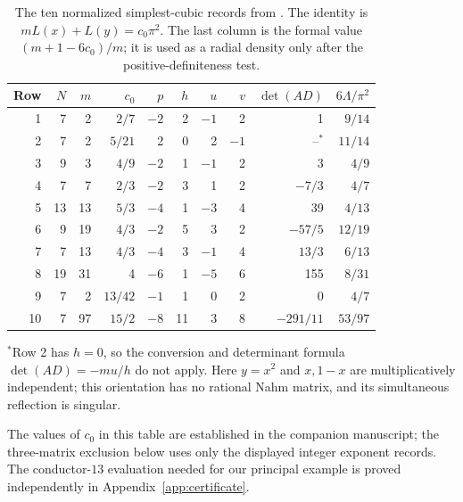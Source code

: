 \documentclass[11pt,reqno]{amsart}
\theoremstyle{remark}
\numberwithin{equation}{section}
\begin{document}
\begin{table}[htbp]
\caption{The ten normalized simplest-cubic records from
\cite{CubicClassification}. The identity is $mL(x)+L(y)=c_0\pi^2$.
The last column is the formal value $(m+1-6c_0)/m$; it is used as a
radial density only after the positive-definiteness test.}\label{tab:arithmetic-sieve}
\centering\small
\renewcommand{\arraystretch}{1.12}
\begin{tabular}{@{}rrrrrrrrrr@{}}\toprule
Row&$N$&$m$&$c_0$&$p$&$h$&$u$&$v$&$\det(AD)$&$6\Lambda/\pi^2$\\\midrule
1&7&2&$2/7$&$-2$&2&$-1$&2&1&$9/14$\\
2&7&2&$5/21$&2&0&2&$-1$&$\text{--}^{\ast}$&$11/14$\\
3&9&3&$4/9$&$-2$&1&$-1$&2&3&$4/9$\\
4&7&7&$2/3$&$-2$&3&1&2&$-7/3$&$4/7$\\
5&13&13&$5/3$&$-4$&1&$-3$&4&39&$4/13$\\
6&9&19&$4/3$&$-2$&5&3&2&$-57/5$&$12/19$\\
7&7&13&$4/3$&$-4$&3&$-1$&4&$13/3$&$6/13$\\
8&19&31&4&$-6$&1&$-5$&6&155&$8/31$\\
9&7&2&$13/42$&$-1$&1&0&2&0&$4/7$\\
10&7&97&$15/2$&$-8$&11&3&8&$-291/11$&$53/97$\\\bottomrule
\end{tabular}
\par\smallskip
\begin{minipage}{0.96\textwidth}\footnotesize
$^{\ast}$Row 2 has $h=0$, so the conversion and determinant formula
$\det(AD)=-mu/h$ do not apply. Here $y=x^2$ and $x,1-x$ are
multiplicatively independent; this orientation has no rational Nahm
matrix, and its simultaneous reflection is singular.
\end{minipage}
\end{table}
The values of $c_0$ in this table are established in the companion
manuscript; the three-matrix exclusion below uses only the displayed
integer exponent records. The conductor-$13$ evaluation needed for our
principal example is proved independently in Appendix~\ref{app:certificate}.
\end{document}
